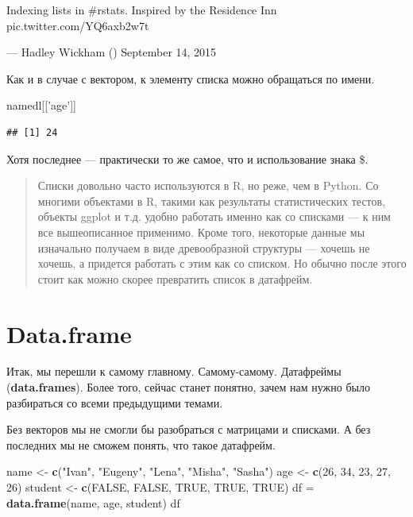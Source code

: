 \documentclass[]{book}
\newenvironment{Shaded}{\begin{snugshade}}{\end{snugshade}}
\newcommand{\DecValTok}[1]{\textcolor[rgb]{0.00,0.00,0.81}{#1}}
\newcommand{\KeywordTok}[1]{\textcolor[rgb]{0.13,0.29,0.53}{\textbf{#1}}}
\newcommand{\NormalTok}[1]{#1}
\newcommand{\OtherTok}[1]{\textcolor[rgb]{0.56,0.35,0.01}{#1}}
\newcommand{\StringTok}[1]{\textcolor[rgb]{0.31,0.60,0.02}{#1}}
\begin{document}
Indexing lists in \#rstats. Inspired by the Residence Inn pic.twitter.com/YQ6axb2w7t

--- Hadley Wickham (\citet{hadleywickham}) September 14, 2015

Как и в случае с вектором, к элементу списка можно обращаться по имени.

\begin{Shaded}
\begin{Highlighting}[]
\NormalTok{namedl[[}\StringTok{'age'}\NormalTok{]]}
\end{Highlighting}
\end{Shaded}

\begin{verbatim}
## [1] 24
\end{verbatim}

Хотя последнее --- практически то же самое, что и использование знака \$.

\begin{quote}
Списки довольно часто используются в R, но реже, чем в Python. Со многими объектами в R, такими как результаты статистических тестов, объекты ggplot и т.д. удобно работать именно как со списками --- к ним все вышеописанное применимо. Кроме того, некоторые данные мы изначально получаем в виде древообразной структуры --- хочешь не хочешь, а придется работать с этим как со списком. Но обычно после этого стоит как можно скорее превратить список в датафрейм.
\end{quote}

\hypertarget{df}{%
\section{Data.frame}\label{df}}

Итак, мы перешли к самому главному. Самому-самому. Датафреймы (\textbf{data.frames}). Более того, сейчас станет понятно, зачем нам нужно было разбираться со всеми предыдущими темами.

Без векторов мы не смогли бы разобраться с матрицами и списками. А без последних мы не сможем понять, что такое датафрейм.

\begin{Shaded}
\begin{Highlighting}[]
\NormalTok{name <-}\StringTok{ }\KeywordTok{c}\NormalTok{(}\StringTok{"Ivan"}\NormalTok{, }\StringTok{"Eugeny"}\NormalTok{, }\StringTok{"Lena"}\NormalTok{, }\StringTok{"Misha"}\NormalTok{, }\StringTok{"Sasha"}\NormalTok{) }
\NormalTok{age <-}\StringTok{ }\KeywordTok{c}\NormalTok{(}\DecValTok{26}\NormalTok{, }\DecValTok{34}\NormalTok{, }\DecValTok{23}\NormalTok{, }\DecValTok{27}\NormalTok{, }\DecValTok{26}\NormalTok{) }
\NormalTok{student <-}\StringTok{ }\KeywordTok{c}\NormalTok{(}\OtherTok{FALSE}\NormalTok{, }\OtherTok{FALSE}\NormalTok{, }\OtherTok{TRUE}\NormalTok{, }\OtherTok{TRUE}\NormalTok{, }\OtherTok{TRUE}\NormalTok{) }
\NormalTok{df =}\StringTok{ }\KeywordTok{data.frame}\NormalTok{(name, age, student)  }
\NormalTok{df}
\end{Highlighting}
\end{Shaded}
\end{document}
